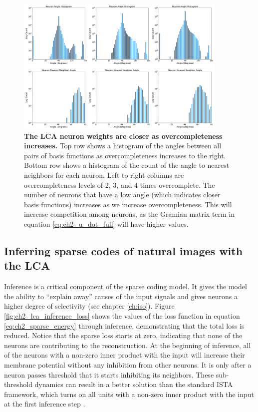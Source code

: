 \begin{figure}[h]
    \centering
    \includegraphics[width=0.9\textwidth]{figures/lca_angle_hists.png}
    \caption{\textbf{The LCA neuron weights are closer as overcompleteness increases.} Top row shows a histogram of the angles between all pairs of basis functions as overcompleteness increases to the right. Bottom row shows a histogram of the count of the angle to nearest neighbors for each neuron. Left to right columns are overcompleteness levels of 2, 3, and 4 times overcomplete. The number of neurons that have a low angle (which indicates closer basis functions) increases as we increase overcompleteness. This will increase competition among neurons, as the Gramian matrix term in equation \eqref{eq:ch2_u_dot_full} will have higher values.}
    \label{fig:ch2_lca_angle_histograms}
\end{figure}


\subsection{Inferring sparse codes of natural images with the LCA}
Inference is a critical component of the sparse coding model. It gives the model the ability to ``explain away'' causes of the input signals \parencite{olshausen1997sparse} and gives neurons a higher degree of selectivity (see chapter \ref{ch:iso}). Figure \ref{fig:ch2_lca_inference_loss} shows the values of the loss function in equation \eqref{eq:ch2_sparse_energy} through inference, demonstrating that the total loss is reduced. Notice that the sparse loss starts at zero, indicating that none of the neurons are contributing to the reconstruction. At the beginning of inference, all of the neurons with a non-zero inner product with the input will increase their membrane potential without any inhibition from other neurons. It is only after a neuron passes threshold that it starts inhibiting its neighbors. These sub-threshold dynamics can result in a better solution than the standard ISTA framework, which turns on all units with a non-zero inner product with the input at the first inference step \parencite{rozell2008sparse}.

